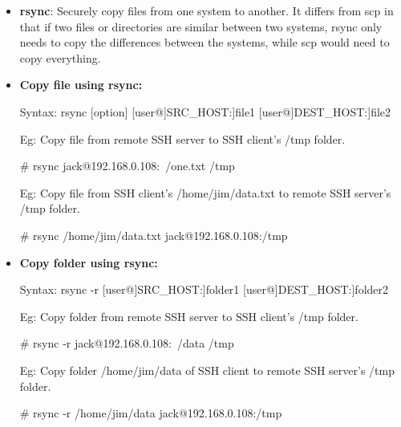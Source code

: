 \setlength{\columnsep}{3pt}
\begin{flushleft}

\begin{itemize}
	\item \textbf{rsync}: Securely copy files from one system to another. It differs from scp in that if two files or directories are similar between two systems, rsync only needs to copy the differences between the systems, while scp would need to copy everything.
	\bigskip
		
	\item \textbf{Copy file using rsync:}
	\begin{tcolorbox}[breakable,notitle,boxrule=0pt,colback=pink,colframe=pink]
		\color{black}

		Syntax: rsync [option] [user@]SRC\_HOST:]file1 [user@]DEST\_HOST:]file2

	\end{tcolorbox}
	
	\bigskip
	
	Eg: Copy file from remote SSH server to SSH client's /tmp folder.
	\begin{tcolorbox}[breakable,notitle,boxrule=-0pt,colback=black,colframe=black]
		\color{green}
		\font=9pt
		\# rsync jack@192.168.0.108:~/one.txt  /tmp
		\font=4pt
	\end{tcolorbox}

	\bigskip
	
	Eg: Copy file from SSH client's /home/jim/data.txt to remote SSH server's /tmp folder.
	\begin{tcolorbox}[breakable,notitle,boxrule=-0pt,colback=black,colframe=black]
		\color{green}
		\font=9pt
		\# rsync  /home/jim/data.txt  jack@192.168.0.108:/tmp
		\font=4pt
	\end{tcolorbox}

	\item \textbf{Copy folder using rsync:}
	\begin{tcolorbox}[breakable,notitle,boxrule=0pt,colback=pink,colframe=pink]
		\color{black}
		\font=9pt
		Syntax: rsync -r [user@]SRC\_HOST:]folder1 [user@]DEST\_HOST:]folder2
		\font=4pt
	\end{tcolorbox}

	\bigskip

	Eg: Copy folder from remote SSH server to SSH client's /tmp folder.
	\begin{tcolorbox}[breakable,notitle,boxrule=-0pt,colback=black,colframe=black]
		\color{green}
		\font=9pt
		\# rsync -r jack@192.168.0.108:~/data  /tmp
		\font=4pt
	\end{tcolorbox}
	
	\bigskip
	Eg: Copy folder /home/jim/data of SSH client to remote SSH server's /tmp folder.
	\begin{tcolorbox}[breakable,notitle,boxrule=-0pt,colback=black,colframe=black]
		\color{green}
		\font=9pt
		\# rsync -r /home/jim/data  jack@192.168.0.108:/tmp
		\font=4pt
	\end{tcolorbox}
		
\end{itemize}

\end{flushleft}
\newpage


